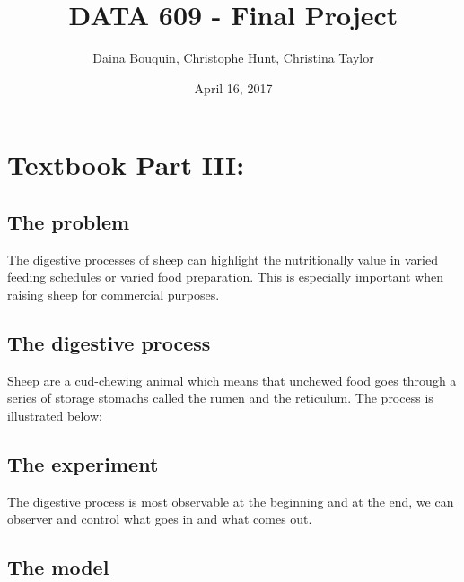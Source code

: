 \documentclass[]{article}
\title{DATA 609 - Final Project}
\author{Daina Bouquin, Christophe Hunt, Christina Taylor}
\date{April 16, 2017}
\begin{document}
\maketitle

{
\setcounter{tocdepth}{2}
\tableofcontents
}
\newpage

\section{Textbook Part III:}\label{textbook-part-iii}

\subsection{The problem}\label{the-problem}

The digestive processes of sheep can highlight the nutritionally value
in varied feeding schedules or varied food preparation. This is
especially important when raising sheep for commercial purposes.

\subsection{The digestive process}\label{the-digestive-process}

Sheep are a cud-chewing animal which means that unchewed food goes
through a series of storage stomachs called the rumen and the reticulum.
The process is illustrated below:


\subsection{The experiment}\label{the-experiment}

The digestive process is most observable at the beginning and at the
end, we can observer and control what goes in and what comes out.

\subsection{The model}\label{the-model}
\end{document}
